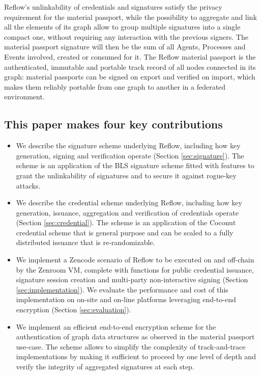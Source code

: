 \documentclass[twocolumn]{article}
\begin{document}
Reflow's unlinkability of credentials and signatures satisfy the privacy
requirement for the material passport, while the possibility to
aggregate and link all the elements of its graph allow to group multiple
signatures into a single compact one, without requiring any interaction
with the previous signers. The material passport signature will then be
the sum of all Agents, Processes and Events involved, created or
consumed for it. The Reflow material passport is the authenticated,
immutable and portable track record of all nodes connected in its graph:
material passports can be signed on export and verified on import, which
makes them reliably portable from one graph to another in a federated
environment.

\subsection*{This paper makes four key contributions}

\begin{itemize}
\item We describe the signature scheme underlying Reflow, including how
  key generation, signing and verification operate (Section
  \ref{sec:signature}). The scheme is an application of the BLS signature scheme
  \citep{asiacrypt-bls} fitted with features to grant the unlinkability of
  signatures and to secure it against rogue-key attacks.
\item We describe the credential scheme underlying Reflow, including how
  key generation, issuance, aggregation and verification of credentials operate
  (Section \ref{sec:credential}). The scheme is an application of the Coconut
  credential scheme \citep{coconut-2018} that is general purpose and can be
  scaled to a fully distributed issuance that is re-randomizable.
\item We implement a Zencode scenario of Reflow to be executed on and
  off-chain by the Zenroom VM, complete with functions for public credential
  issuance, signature session creation and multi-party non-interactive signing
  (Section \ref{sec:implementation}). We evaluate the performance and cost of
  this implementation on on-site and on-line platforms leveraging end-to-end
  encryption (Section \ref{sec:evaluation}).
\item We implement an efficient end-to-end encryption scheme for the
authentication of graph data structures as observed in the material
passport use-case. The scheme allows to simplify the complexity of track-and-trace implementations by making it sufficient to proceed by one level of depth and verify the integrity of aggregated signatures at each step.
\end{itemize}
\end{document}
